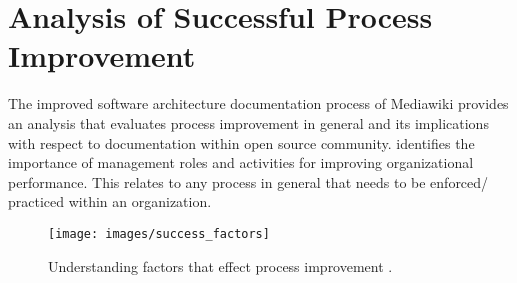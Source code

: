\section{Analysis of Successful Process Improvement}
The improved software architecture documentation process of Mediawiki provides an analysis that evaluates process improvement in general and its implications with respect to documentation within open source community. \cite{Dyba2005} identifies the importance of management roles and activities for improving organizational performance. This relates to any process in general that needs to be enforced/ practiced within an organization.
\begin{figure}[H]
  \centering
  \texttt{[image: images/success\_factors]}
  \caption[Understanding factors that effect process improvement]{Understanding factors that effect process improvement \cite{Dyba2005}.}\label{fig:Process_Roles}
\end{figure}



